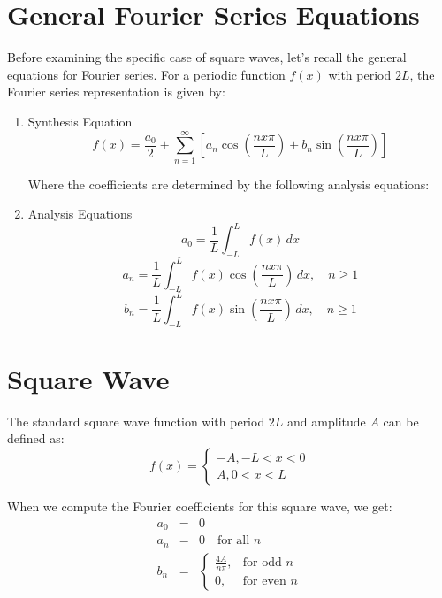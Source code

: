 \documentclass{article}
\begin{document}
\section{General Fourier Series Equations}

Before examining the specific case of square waves, let's recall the general equations for Fourier series. For a periodic function $f(x)$ with period $2L$, the Fourier series representation is given by:


\begin{enumerate}
    \item Synthesis Equation
    \begin{equation}
    f(x) = \frac{a_0}{2} + \sum_{n=1}^{\infty} \left[ a_n \cos\left(\frac{nx\pi}{L}\right) + b_n \sin(\frac{nx\pi}{L}) \right] 
\end{equation}


Where the coefficients are determined by the following analysis equations:

    \item Analysis Equations
    \begin{equation}
    a_0 = \frac{1}{L} \int_{-L}^{L} f(x) \, dx
    \label{a0}
    \end{equation}
    \begin{equation}
    a_n = \frac{1}{L} \int_{-L}^{L} f(x) \cos(\frac{nx\pi}{L}) \, dx, \quad n \geq 1
    \end{equation}
    \begin{equation}
    b_n = \frac{1}{L} \int_{-L}^{L} f(x) \sin(\frac{nx\pi}{L}) \, dx, \quad n \geq 1
    \label{bn}
    \end{equation}
    \end{enumerate}

\section{Square Wave}
The standard square wave function with period $2L$ and amplitude $A$ can be defined as:
\begin{equation}
    f(x) = 
\begin{cases} 
-A,     -L < x < 0 \\
A,      0 < x < L
\end{cases}
    \end{equation}

When we compute the Fourier coefficients for this square wave, we get:
\begin{eqnarray}
a_0 &=& 0 \\
a_n &=& 0 \quad \text{for all } n\\
b_n &=& 
\begin{cases} 
\frac{4A}{n\pi}, & \text{for odd } n \\
0, & \text{for even } n
\end{cases}
\end{eqnarray}
\end{document}
